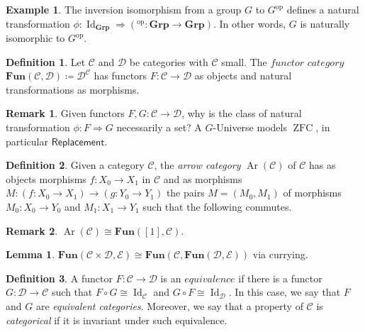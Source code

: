 \documentclass[10pt,letterpaper,cm]{nupset}
\theoremstyle{definition}
\newtheorem*{definition}{Definition}
\newtheorem{exmp}{Example}
\newtheorem{remark}{Remark}
\newtheorem{lemma}{Lemma}
\newcommand{\1}{\mathbf{1}}
\renewcommand{\c}{\mathscr{C}}
\renewcommand{\d}{\mathscr{D}}
\newcommand{\e}{\mathscr{E}}
\newcommand{\0}{\vec 0}
\DeclareMathOperator{\id}{Id}
\DeclareMathOperator{\op}{op}
\DeclareMathOperator{\ar}{Ar}
\DeclareMathOperator{\ZFC}{ZFC}
\begin{document}
\begin{exmp}
The inversion isomorphism from a group $G$ to $G^{\op}$ defines a natural transformation $\phi: \id_{\mathbf{Grp}} \Rightarrow (^{\op}: \mathbf{Grp} \to \mathbf{Grp})$. In other words, $G$ is naturally isomorphic to $G^{\op}$.
\end{exmp}

\begin{definition}
Let $\c$ and $\d$ be categories with $\c$ small. The $\textit{functor category}$ $\mathbf{Fun}(\c, \d)\coloneqq \d^\c$ has functors $F: \c \to \d$ as objects and natural transformations as morphisms. 
\end{definition}

\begin{remark}
Given functors $F, G: \c \to \d$, why is the class of natural transformation $\phi: F \Rightarrow G$ necessarily a set?
A $G$-Universe models $\ZFC$, in particular $\mathsf{Replacement}$.
\end{remark}

\begin{definition}
Given a category $\c$, the \textit{arrow category} $\ar(\c)$ of $\c$ has as objects morphisms $f: X_0 \to X_1$ in $\c$ and as morphisms $M: (f: X_0 \to X_1) \to (g: Y_0 \to Y_1)$ the pairs $M=(M_0, M_1)$ of morphisms $M_0 : X_0 \to Y_0$ and $M_1 : X_1 \to Y_1$ such that the following commutes. 

\begin{center}
\end{center}

\begin{remark}$\ar(\c) \cong \mathbf{Fun}([1], \c)$.
\end{remark}
\end{definition}

\begin{lemma}
$\mathbf{Fun}(\c \times \d, \e) \cong \mathbf{Fun}(\c, \mathbf{Fun}( \d, \e))$ via currying. 
\end{lemma}

\begin{definition}
A functor $F: \c \to \d$ is an $\textit{equivalence}$ if there is a functor $G: \d \to \c$ such that $F \circ G \cong \id_{\c}$ and $G \circ F \cong \id_{\d}$. In this case, we say that $F$ and $G$ are \textit{equivalent categories}. Moreover, we say that a property of $\c$ is \textit{categorical} if it is invariant under such equivalence.
\end{definition}
\end{document}
